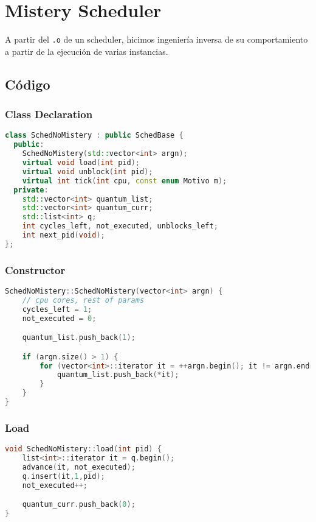 \section{Mistery Scheduler}

A partir del \texttt{.o} de un scheduler, hicimos ingeniería inversa de su comportamiento a partir de la ejecución de varias instancias.

\subsection{Código}

\subsubsection{Class Declaration}
\begin{lstlisting}[language=C++, breaklines=true]
class SchedNoMistery : public SchedBase {
  public:
    SchedNoMistery(std::vector<int> argn);
    virtual void load(int pid);
    virtual void unblock(int pid);
    virtual int tick(int cpu, const enum Motivo m);
  private:
	std::vector<int> quantum_list;
	std::vector<int> quantum_curr;
	std::list<int> q;
	int cycles_left, not_executed, unblocks_left;
	int next_pid(void);
};
\end{lstlisting}


\subsubsection{Constructor}
\begin{lstlisting}[language=C++, breaklines=true]
SchedNoMistery::SchedNoMistery(vector<int> argn) {
	// cpu cores, rest of params
	cycles_left = 1;
	not_executed = 0;

	quantum_list.push_back(1);

	if (argn.size() > 1) {
		for (vector<int>::iterator it = ++argn.begin(); it != argn.end(); ++it) {
			quantum_list.push_back(*it);
		}
	}
}
\end{lstlisting}

\subsubsection{Load}
\begin{lstlisting}[language=C++, breaklines=true]
void SchedNoMistery::load(int pid) {
	list<int>::iterator it = q.begin();
	advance(it, not_executed);
	q.insert(it,1,pid);
	not_executed++;

	quantum_curr.push_back(0);
}
\end{lstlisting}

